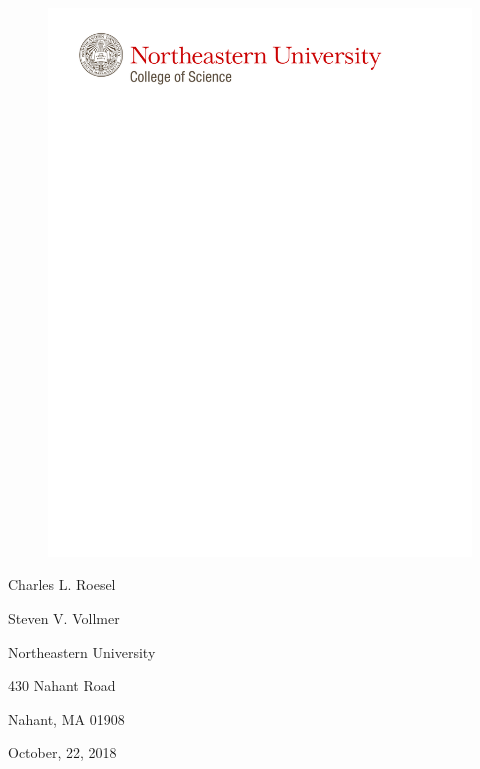 \documentclass[12pt,portrait]{article}
\title{}
\author{}
\date{}
\begin{document}
\begin{figure}
    \advance\leftskip-1.5cm
    \vspace{-2cm}
    \includegraphics[width=\paperwidth]{NU_COS_ELetterhead_2013.pdf}
\end{figure}
\singlespacing
\begin{flushright}
Charles L. Roesel
\end{flushright}
\begin{flushright}
Steven V. Vollmer
\end{flushright}
\begin{flushright}
Northeastern University
\end{flushright}
\begin{flushright}
430 Nahant Road
\end{flushright}
\begin{flushright}
Nahant, MA 01908  
\end{flushright}

October, 22, 2018
\end{document}

